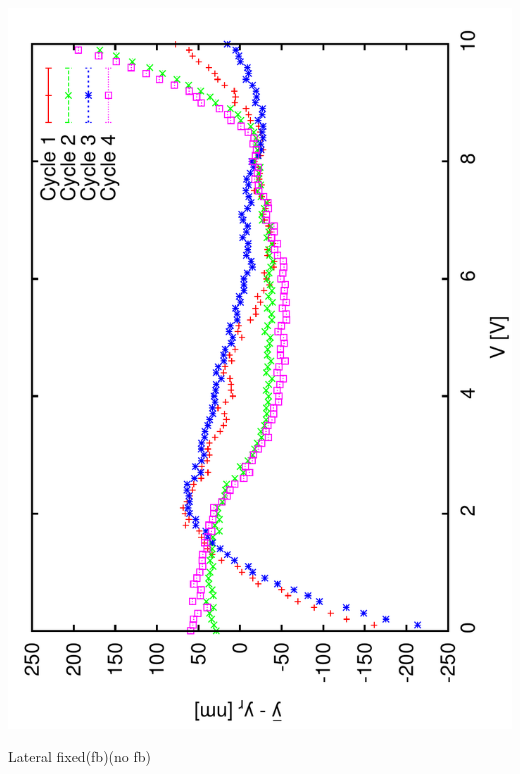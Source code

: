 \documentclass[a4paper,11pt]{book}
\begin{document}
\includegraphics[angle=-90,scale=0.14]{image06e.pdf}\par
Lateral fixed\hspace{1.8cm}(fb)\hspace{3.0cm}(no fb)\par
\end{document}
